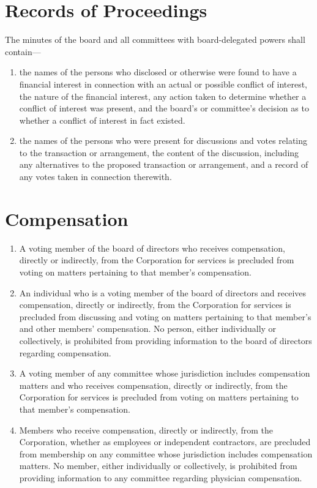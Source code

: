 \documentclass[12pt]{article}
\begin{document}
\section{Records of Proceedings}

The minutes of the board and all committees with board-delegated 
powers shall contain---

\begin{enumerate}

\item the names of the persons who disclosed or otherwise were 
found to have a financial interest in connection with an actual 
or possible conflict of interest, the nature of the financial 
interest, any action taken to determine whether a conflict of 
interest was present, and the board's or committee's decision as 
to whether a conflict of interest in fact existed. 

\item the names of the persons who were present for discussions 
and votes relating to the transaction or arrangement, the content 
of the discussion, including any alternatives to the proposed 
transaction or arrangement, and a record of any votes taken in 
connection therewith. 
\end{enumerate}

\section{Compensation}

\begin{enumerate}
\item A voting member of the board of directors who receives 
compensation, directly or indirectly, from the Corporation for 
services is precluded from voting on matters pertaining to that 
member's compensation. 

\item An individual who is a voting member of the board of 
directors and receives compensation, directly or indirectly, from 
the Corporation for services is precluded from discussing and 
voting on matters pertaining to that member's and other members' 
compensation. No person, either individually or collectively, is 
prohibited from providing information to the board of directors 
regarding compensation. 

\item A voting member of any committee whose jurisdiction 
includes compensation matters and who receives compensation, 
directly or indirectly, from the Corporation for services is 
precluded from voting on matters pertaining to that member's 
compensation. 

\item Members who receive compensation, directly or indirectly, 
from the Corporation, whether as employees or independent 
contractors, are precluded from membership on any committee whose 
jurisdiction includes compensation matters. No member, either 
individually or collectively, is prohibited from providing 
information to any committee regarding physician compensation. 
\end{enumerate}
\end{document}
